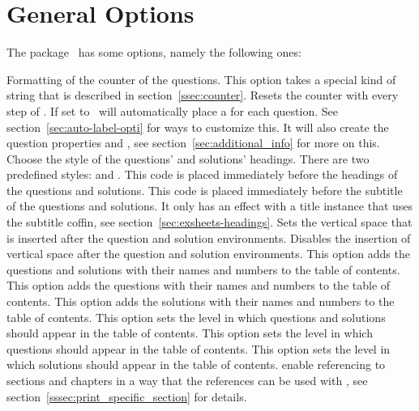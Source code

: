 \documentclass[load-preamble+]{cnltx-doc}
\begin{document}
\section{General Options}\label{sec:options}
The package \ExSheets\ has some options, namely the following ones:
\begin{options}
    Formatting of the counter of the questions.  This option takes a special
    kind of string that is described in section~\ref{ssec:counter}.
  \Default
    Resets the  counter with every step of .
    If set to  \ExSheets\ will automatically place a
     for each question.  See
    section~\ref{sec:auto-label-opti} for ways to customize this.  It will
    also create the question properties  and , see
    section~\ref{sec:additional_info} for more on this.
    Choose the style of the questions' and solutions' headings.  There are two
    predefined styles:  and .
    This code is placed immediately before the headings of the questions and
    solutions.
    This code is placed immediately before the subtitle of the questions and
    solutions.  It only has an effect with a title instance that uses the
    subtitle coffin, see section~\ref{sec:exsheets-headings}.
    Sets the vertical space that is inserted after the
    question and solution environments.
    Disables the insertion of vertical space after the
    question and solution environments.
    This option adds the questions and solutions with their names and numbers
    to the table of contents.
    This option adds the questions with their names and numbers to the table
    of contents.
    This option adds the solutions with their names and numbers to the table
    of contents.
    This option sets the level in which questions and solutions should appear
    in the table of contents.
    This option sets the level in which questions should appear in the table
    of contents.
    This option sets the level in which solutions should appear in the table
    of contents.
    enable referencing to sections and chapters in a way that the references
    can be used with , see
    section~\ref{sssec:print_specific_section} for details.
\end{options}
\end{document}
